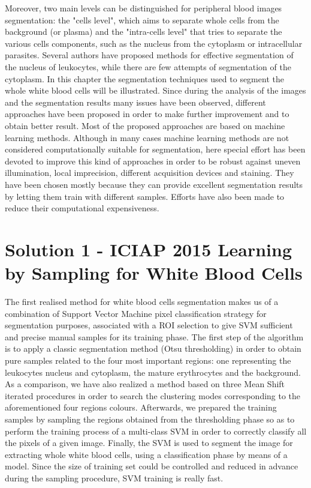 \documentclass[final,a4paper,12pt,english]{UnicaPhdThesis3}
\begin{document}
	Moreover, two main levels can be distinguished for peripheral blood images segmentation: the "cells level", which aims to separate whole cells from the background (or plasma) and the "intra-cells level" that tries to separate the various cells components, such as the nucleus from the cytoplasm or intracellular parasites. Several authors have proposed methods for effective segmentation of the nucleus of leukocytes, while there are few attempts of segmentation of the cytoplasm. In this chapter the segmentation techniques used to segment the whole white blood cells will be illustrated. Since during the analysis of the images and the segmentation results many issues have been observed, different approaches have been proposed in order to make further improvement and to obtain better result. Most of the proposed approaches are based on machine learning methods. Although in many cases machine learning methods are not considered computationally suitable for segmentation, here special effort has been devoted to improve this kind of approaches in order to be robust against uneven illumination, local imprecision, different acquisition devices and staining. They have been chosen mostly because they can provide excellent segmentation results by letting them train with different samples. Efforts have also been made to reduce their computational expensiveness.
	
	\section{Solution 1 - ICIAP 2015 Learning by Sampling for White Blood Cells}
	The first realised method for white blood cells segmentation makes us of a combination of Support Vector Machine pixel classification strategy for segmentation purposes, associated with a ROI selection to give SVM sufficient and precise manual samples for its training phase. 
	The first step of the algorithm is to apply a classic segmentation method (Otsu thresholding) in order to obtain pure samples related to the four most important regions: one representing the leukocytes nucleus and cytoplasm, the mature erythrocytes and the background. As a comparison, we have also realized a method based on three Mean Shift iterated procedures in order to search the clustering modes corresponding to the aforementioned four regions colours. Afterwards, we prepared the training samples by sampling the regions obtained from the thresholding phase so as to perform the training process of a multi-class SVM in order to correctly classify all the pixels of a given image. Finally, the SVM is used to segment the image for extracting whole white blood cells, using a classification phase by means of a model. Since the size of training set could be controlled and reduced in advance during the sampling procedure, SVM training is really fast.
	
\end{document}
